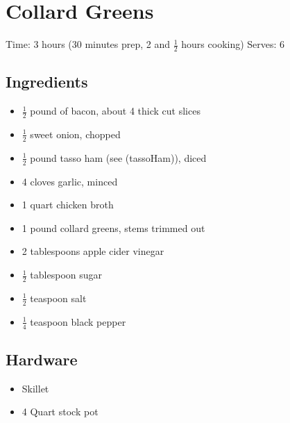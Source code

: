 \section{Collard Greens}
\label{collardGreens}
\setcounter{secnumdepth}{0}
Time: 3 hours (30 minutes prep, 2 and \( \frac{1}{2} \) hours cooking)
Serves: 6

\begin{multicols}{2}
\subsection*{Ingredients}
\begin{itemize}
    \item \( \frac{1}{2} \) pound of bacon, about 4 thick cut slices
    \item \( \frac{1}{2} \) sweet onion, chopped
    \item \( \frac{1}{2} \) pound tasso ham (see \nameref(tassoHam)), diced
    \item 4 cloves garlic, minced
    \item 1 quart chicken broth
    \item 1 pound collard greens, stems trimmed out
    \item 2 tablespoons apple cider vinegar
    \item \( \frac{1}{2} \) tablespoon sugar
    \item \( \frac{1}{2} \) teaspoon salt
    \item \( \frac{1}{4} \) teaspoon black pepper
\end{itemize}

\subsection*{Hardware}
\begin{itemize}
    \item Skillet
    \item 4 Quart stock pot
\end{itemize}
\clearpage


\end{multicols}
